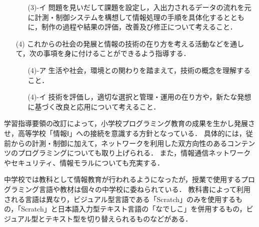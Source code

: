 \documentclass[12pt,a4j,titlepage]{ltjsarticle}
\begin{document}
\begin{enumerate}
\begin{enumerate}
\item[(3)-イ] 問題を見いだして課題を設定し，入出力されるデータの流れを元に計測・制御システムを構想して情報処理の手順を具体化するとともに，制作の過程や結果の評価，改善及び修正について考えること．
\end{enumerate}

\item[(4)] これからの社会の発展と情報の技術の在り方を考える活動などを通して，次の事項を身に付けることができるよう指導する．
\begin{enumerate}
\item[(4)-ア] 生活や社会，環境との関わりを踏まえて，技術の概念を理解すること．

\item[(4)-イ] 技術を評価し，適切な選択と管理・運用の在り方や，新たな発想に基づく改良と応用について考えること．
\end{enumerate}
\end{enumerate}

学習指導要領の改訂によって，小学校プログラミング教育の成果を生かし発展させ，高等学校「情報Ⅰ」への接続を意識する方針となっている．
具体的には，従前からの計測・制御に加えて，ネットワークを利用した双方向性のあるコンテンツのプログラミングについても取り上げられる．
また，情報通信ネットワークやセキュリティ、情報モラルについても充実する．

中学校では教科として情報教育が行われるようになったが，授業で使用するプログラミング言語や教材は個々の中学校に委ねられている．
教科書によって利用される言語は異なり，ビジュアル型言語である「Scratch」のみを使用するもの\cite{tyugaku_kyo1}，「Scratch」と日本語入力型テキスト言語の「なでしこ」を併用するもの\cite{tyugaku_kyo2}，ビジュアル型とテキスト型を切り替えられるものなどがある\cite{tyugaku_kyo3}．
\end{document}
